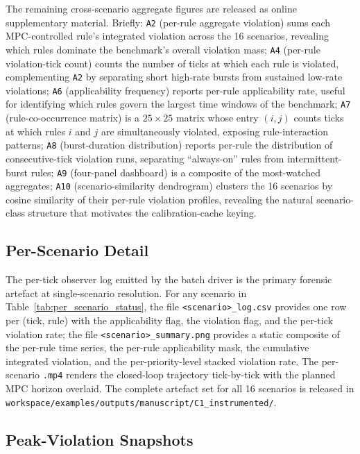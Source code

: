 The remaining cross-scenario aggregate figures are released as online supplementary material. Briefly: \texttt{A2} (per-rule aggregate violation) sums each MPC-controlled rule's integrated violation across the 16 scenarios, revealing which rules dominate the benchmark's overall violation mass; \texttt{A4} (per-rule violation-tick count) counts the number of ticks at which each rule is violated, complementing \texttt{A2} by separating short high-rate bursts from sustained low-rate violations; \texttt{A6} (applicability frequency) reports per-rule applicability rate, useful for identifying which rules govern the largest time windows of the benchmark; \texttt{A7} (rule-co-occurrence matrix) is a $25 \times 25$ matrix whose entry $(i, j)$ counts ticks at which rules $i$ and $j$ are simultaneously violated, exposing rule-interaction patterns; \texttt{A8} (burst-duration distribution) reports per-rule the distribution of consecutive-tick violation runs, separating ``always-on'' rules from intermittent-burst rules; \texttt{A9} (four-panel dashboard) is a composite of the most-watched aggregates; \texttt{A10} (scenario-similarity dendrogram) clusters the 16 scenarios by cosine similarity of their per-rule violation profiles, revealing the natural scenario-class structure that motivates the calibration-cache keying.

\subsection{Per-Scenario Detail}
\label{sec:singlecondition:detail}

The per-tick observer log emitted by the batch driver is the primary forensic artefact at single-scenario resolution. For any scenario in Table~\ref{tab:per_scenario_status}, the file \texttt{<scenario>\_log.csv} provides one row per (tick, rule) with the applicability flag, the violation flag, and the per-tick violation rate; the file \texttt{<scenario>\_summary.png} provides a static composite of the per-rule time series, the per-rule applicability mask, the cumulative integrated violation, and the per-priority-level stacked violation rate. The per-scenario \texttt{.mp4} renders the closed-loop trajectory tick-by-tick with the planned MPC horizon overlaid. The complete artefact set for all 16 scenarios is released in \texttt{workspace/examples/outputs/manuscript/C1\_instrumented/}.

\subsection{Peak-Violation Snapshots}
\label{sec:singlecondition:snapshots}

